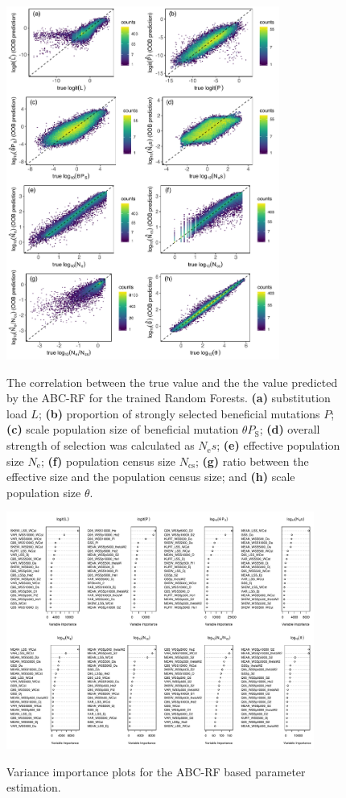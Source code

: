 \documentclass[12pt]{article}
\begin{document}
\begin{figure}[ht]
  \centering
  \includegraphics[width=0.80\textwidth]{Figures/oob_plots_ggplot2_mod.pdf}
  \label{fig:figS3}
  \caption{The correlation between the true value and the the value predicted by the ABC-RF for the trained Random Forests. \textbf{(a)} substitution load $L$; \textbf{(b)} proportion of strongly selected beneficial mutations $P$; \textbf{(c)} scale population size of beneficial mutation $\theta P_{\mathrm{S}}$; \textbf{(d)} overall strength of selection was calculated as $N_{\mathrm{e}}s$; \textbf{(e)} effective population size $N_{\mathrm{e}}$; \textbf{(f)} population census size $N_{\mathrm{cs}}$; \textbf{(g)} ratio between the effective size and the population census size; and \textbf{(h)} scale population size $\theta$.}
\end{figure}

\begin{figure}[ht]
  \centering
  \includegraphics[width=0.9\textwidth]{Figures/varimportance_plots.pdf}
  \label{fig:figS4}
  \caption{Variance importance plots for the ABC-RF based parameter estimation.}
\end{figure}
\end{document}
